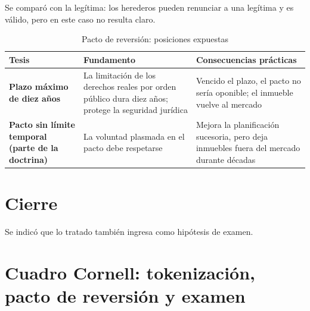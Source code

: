 \documentclass[12pt,oneside]{book}
\begin{document}
Se comparó con la legítima: los herederos pueden renunciar a una legítima y es válido, pero en este caso no resulta claro.

\begin{table}[H]
\centering
\small
\begin{tabularx}{\textwidth}{>{\raggedright\arraybackslash}p{3.6cm}YY}
\toprule
\textbf{Tesis} & \textbf{Fundamento} & \textbf{Consecuencias prácticas} \\
\midrule
\textbf{Plazo máximo de diez años} & La limitación de los derechos reales por orden público dura diez años; protege la seguridad jurídica & Vencido el plazo, el pacto no sería oponible; el inmueble vuelve al mercado \\
\addlinespace
\textbf{Pacto sin límite temporal (parte de la doctrina)} & La voluntad plasmada en el pacto debe respetarse & Mejora la planificación sucesoria, pero deja inmuebles fuera del mercado durante décadas \\
\bottomrule
\end{tabularx}
\caption{Pacto de reversión: posiciones expuestas}
\end{table}

\section{Cierre}

Se indicó que lo tratado también ingresa como hipótesis de examen.

\section{Cuadro Cornell: tokenización, pacto de reversión y examen}
\end{document}
